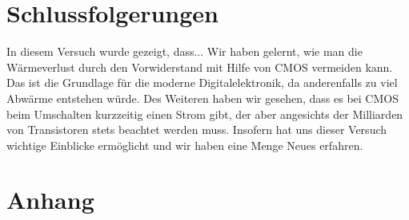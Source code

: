 \documentclass[12pt,a4paper]{scrartcl}
\begin{document}
\section{Schlussfolgerungen}
In diesem Versuch wurde gezeigt, dass...
Wir haben gelernt, wie man die W\"armeverlust durch den Vorwiderstand mit Hilfe von CMOS vermeiden kann.
Das ist die Grundlage f\"ur die moderne Digitalelektronik, da anderenfalls zu viel Abw\"arme entstehen w\"urde.
Des Weiteren haben wir gesehen, dass es bei CMOS beim Umschalten kurzzeitig einen Strom gibt, der aber angesichts der Milliarden von Transistoren stets beachtet werden muss.
Insofern hat uns dieser Versuch wichtige Einblicke erm\"oglicht und wir haben eine Menge Neues erfahren.

\section{Anhang}

\end{document}
